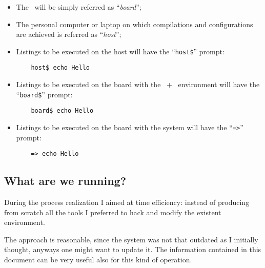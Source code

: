     \begin{itemize}

    \item   The \MyBoard\ will be simply referred as
            ``\emph{board}'';

    \item   The personal computer or laptop on which compilations and
            configurations are achieved is referred as ``\emph{host}'';

    \item   Listings to be executed on the host will have the
            ``\lstinline{host$}'' prompt:
\begin{lstlisting}
    host$ echo Hello
\end{lstlisting}

    \item   Listings to be executed on the board with the
            \BusyBox\ + \Linux\ environment will have the
            ``\lstinline{board$}'' prompt:
\begin{lstlisting}
    board$ echo Hello
\end{lstlisting}

    \item   Listings to be executed on the board with the \uBoot
            system will have the ``\lstinline{=>}'' prompt:
\begin{lstlisting}
    => echo Hello
\end{lstlisting}


    \end{itemize}

\subsection{ What are we running? }

    During the process realization I aimed at time efficiency:
    instead of producing from scratch all the tools I preferred to
    hack and modify the existent environment.

    The approach is reasonable, since the system was not that
    outdated as I initially thought, anyways one might want to
    update it. The information contained in this document can be
    very useful also for this kind of operation.


